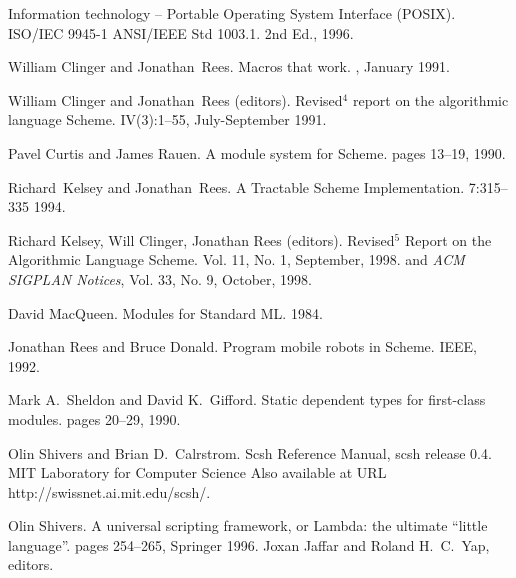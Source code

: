 
\begin{thebibliography}{10}
\addtocounter{chapter}{1}
\T{}

Information technology -- Portable Operating System Interface (POSIX).
\newblock ISO/IEC 9945-1 ANSI/IEEE Std 1003.1.
\newblock 2nd Ed., 1996.

William Clinger and Jonathan~Rees.
\newblock Macros that work.
, January 1991.

William Clinger and Jonathan~Rees (editors).
\newblock Revised${}^4$ report on the algorithmic language {S}cheme.
 IV(3):1--55, July-September 1991.

Pavel Curtis and James Rauen.
\newblock A module system for Scheme.
pages 13--19, 1990.

Richard~Kelsey and Jonathan~Rees.
\newblock A Tractable {Scheme} Implementation.
 7:315--335 1994.

Richard Kelsey, Will Clinger, Jonathan Rees (editors).
\newblock Revised$^5$ Report on the Algorithmic Language Scheme.
 Vol. 11, No. 1,
 September, 1998.
\newblock and {\em ACM SIGPLAN Notices}, Vol. 33, No. 9, October, 1998.

David MacQueen.
\newblock Modules for Standard ML.
1984.

Jonathan Rees and Bruce Donald.
\newblock Program mobile robots in Scheme.
 IEEE, 1992. 

Mark A.~Sheldon and David K.~Gifford.
\newblock Static dependent types for first-class modules.
pages 20--29, 1990.

Olin Shivers and Brian D.~Calrstrom.
\newblock Scsh Reference Manual, scsh release 0.4.
\newblock MIT Laboratory for Computer Science
\newblock Also available at URL http://swissnet.ai.mit.edu/scsh/.

Olin Shivers.
\newblock A universal scripting framework, 
 or Lambda: the ultimate ``little language''.
 pages 254--265, Springer 1996.
\newblock Joxan Jaffar and Roland H.~C.~Yap, editors.

\end{thebibliography}
